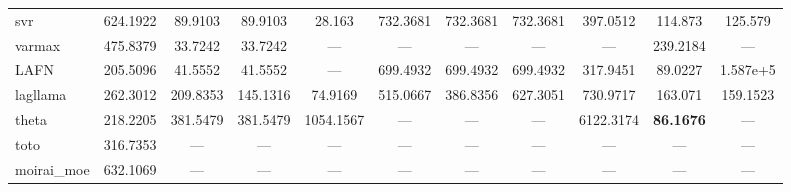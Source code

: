 \begin{table}
\begin{adjustbox}{width=0.95\textheight,center}
\begin{tabular}{lcccccccccc}
svr & 624.1922 & 89.9103 & 89.9103 & 28.163 & 732.3681 & 732.3681 & 732.3681 & 397.0512 & 114.873 & 125.579 \\
varmax & 475.8379 & 33.7242 & 33.7242 & --- & --- & --- & --- & --- & 239.2184 & --- \\
LAFN & 205.5096 & 41.5552 & 41.5552 & --- & 699.4932 & 699.4932 & 699.4932 & 317.9451 & 89.0227 & 1.587e+5 \\
lagllama & 262.3012 & 209.8353 & 145.1316 & 74.9169 & 515.0667 & 386.8356 & 627.3051 & 730.9717 & 163.071 & 159.1523 \\
theta & 218.2205 & 381.5479 & 381.5479 & 1054.1567 & --- & --- & --- & 6122.3174 & \textbf{86.1676} & --- \\
toto & 316.7353 & --- & --- & --- & --- & --- & --- & --- & --- & --- \\
moirai\_moe & 632.1069 & --- & --- & --- & --- & --- & --- & --- & --- & --- \\
\bottomrule
\end{tabular}
\end{adjustbox}
\end{table}

